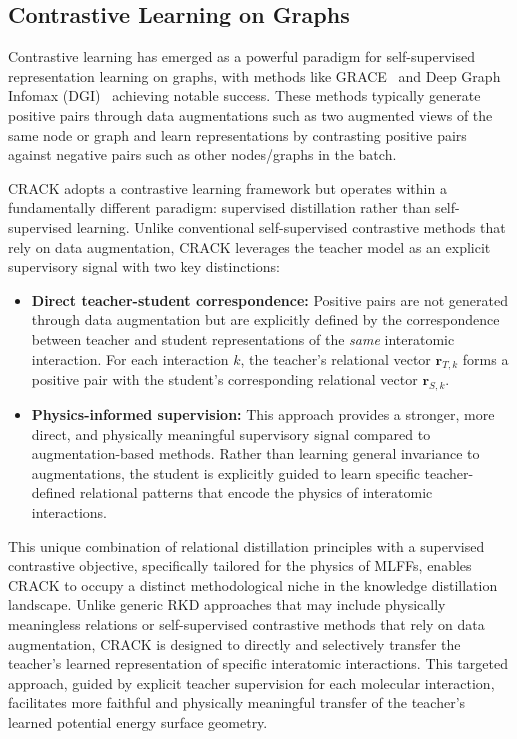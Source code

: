 \documentclass{article}
\begin{document}
\subsection{Contrastive Learning on Graphs}

Contrastive learning has emerged as a powerful paradigm for self-supervised representation learning on graphs, with methods like GRACE~\citep{zhu2020deep} and Deep Graph Infomax (DGI)~\citep{velivckovic2018deep} achieving notable success. 
These methods typically generate positive pairs through data augmentations such as two augmented views of the same node or graph and learn representations by contrasting positive pairs against negative pairs such as other nodes/graphs in the batch.

CRACK adopts a contrastive learning framework but operates within a fundamentally different paradigm: supervised distillation rather than self-supervised learning. Unlike conventional self-supervised contrastive methods that rely on data augmentation, CRACK leverages the teacher model as an explicit supervisory signal with two key distinctions:
\begin{itemize}
\item \textbf{Direct teacher-student correspondence:} Positive pairs are not generated through data augmentation but are explicitly defined by the correspondence between teacher and student representations of the \textit{same} interatomic interaction. For each interaction $k$, the teacher's relational vector $\mathbf{r}_{T,k}$ forms a positive pair with the student's corresponding relational vector $\mathbf{r}_{S,k}$.
\item \textbf{Physics-informed supervision:} This approach provides a stronger, more direct, and physically meaningful supervisory signal compared to augmentation-based methods. Rather than learning general invariance to augmentations, the student is explicitly guided to learn specific teacher-defined relational patterns that encode the physics of interatomic interactions.
\end{itemize}

This unique combination of relational distillation principles with a supervised contrastive objective, specifically tailored for the physics of MLFFs, enables CRACK to occupy a distinct methodological niche in the knowledge distillation landscape. 
Unlike generic RKD approaches that may include physically meaningless relations or self-supervised contrastive methods that rely on data augmentation, CRACK is designed to directly and selectively transfer the teacher's learned representation of specific interatomic interactions. 
This targeted approach, guided by explicit teacher supervision for each molecular interaction, facilitates more faithful and physically meaningful transfer of the teacher's learned potential energy surface geometry.
\end{document}
